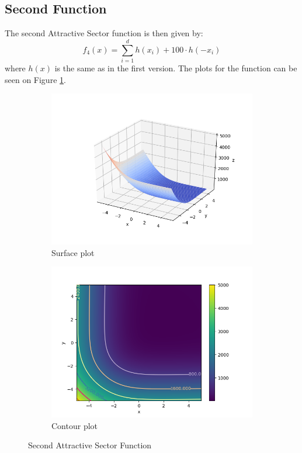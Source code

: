 \documentclass[a4paper]{article}
\begin{document}
\subsection{Second Function}
The second Attractive Sector function is then given by:
\[
f_{4}(x)=\sum_{i=1}^{d} h\left(x_{i}\right)+100 \cdot h\left(-x_{i}\right)
\]
where $h(x)$ is the same as in the first version.
The plots for the function can be seen on Figure \ref{plt5}.
\begin{figure}[H]
  \centering
  \begin{subfigure}[b]{0.49\textwidth}
    \centering
    \includegraphics[width=\textwidth]{imgs/plt51}
    \caption{Surface plot}
  \end{subfigure}
  \begin{subfigure}[b]{0.49\textwidth}
    \centering
    \includegraphics[width=\textwidth]{imgs/plt52}
    \caption{Contour plot}
  \end{subfigure}
  \caption{Second Attractive Sector Function}
  \label{plt5}
\end{figure}
\end{document}

